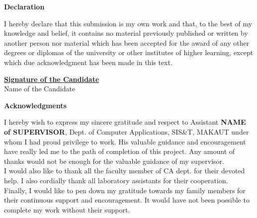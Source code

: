 \documentclass[12pt]{report}
\begin{document}
\newpage


\begin{center}
        \vspace*{1cm}
         \LARGE
        \textbf{Declaration}
        
        \vspace{1.5cm}
 \justify 
 {\fontsize{14pt}{12pt}\selectfont I hereby declare that this submission is my own work and that, to the best of my knowledge and belief, it contains no material previously published or written by another person nor material which has been accepted for the award of any other degrees or diplomas of the university or other institutes of higher learning, except which due acknowledgment has been made in this text.         
 }\\     
		
        \vspace{5.5cm}
      
      
   \begin{minipage}{3in}
 	\textbf{\underline{Signature of the Candidate}} \\

 	   Name of the Candidate
 \end{minipage} 
        
        \vfill
        
       
        
        
        
    \end{center}

\newpage

\begin{center}
        \vspace*{1cm}
         \LARGE
        \textbf{Acknowledgments}
        
        \vspace{1.5cm}
 \justify   
 {\fontsize{14pt}{20pt}\selectfont I hereby wish to express my sincere gratitude and respect to Assistant \textbf{NAME of SUPERVISOR}, Dept. of Computer Applications, SIS\&T, MAKAUT under whom I had proud privilege to work. His valuable guidance and encouragement have really led me to the path of completion of this project. Any amount of thanks would not be enough for the valuable guidance of my supervisor. \\
 I would also like to thank all the faculty member of CA dept. for their devoted help. I also cordially thank all laboratory assistants for their cooperation.\\
 Finally, I would like to pen down my gratitude towards my family members for their continuous support and encouragement. It would have not been possible to complete my work without their support. }     
		
   
        
     
        
       \vfill
        
       
        
        
        
    \end{center}
    
\end{document}
